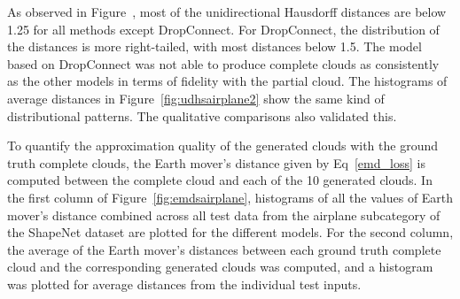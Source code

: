         As observed in Figure~\label{fig:udhsairplane1}, most of the unidirectional Hausdorff distances are below 1.25 for all methods except DropConnect. For DropConnect, the distribution of the distances is more right-tailed, with most distances below 1.5. The model based on DropConnect was not able to produce complete clouds as consistently as the other models in terms of fidelity with the partial cloud. The histograms of average distances in Figure~\ref{fig:udhsairplane2} show the same kind of distributional patterns. The qualitative comparisons also validated this.
        \newline

        To quantify the approximation quality of the generated clouds with the ground truth complete clouds, the Earth mover's distance given by Eq~\ref{emd_loss} is computed between the complete cloud and each of the 10 generated clouds. In the first column of Figure~\ref{fig:emdsairplane}, histograms of all the values of Earth mover's distance combined across all test data from the airplane subcategory of the ShapeNet dataset are plotted for the different models. For the second column, the average of the Earth mover's distances between each ground truth complete cloud and the corresponding generated clouds was computed, and a histogram was plotted for average distances from the individual test inputs.
